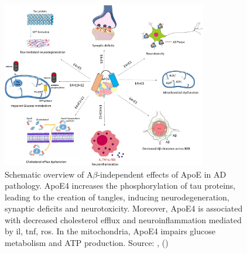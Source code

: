 \documentclass{amsart}
\begin{document}
\begin{figure}[b]
  \includegraphics[width=0.8\textwidth]{figures/ApoEeffectsA.jpg}
    \caption{Schematic overview of A$\beta$-independent effects of ApoE in AD pathology. ApoE4 increases the phosphorylation of tau proteins, leading to the creation of tangles, inducing neurodegeneration, synaptic deficits and neurotoxicity. Moreover, ApoE4 is associated with decreased cholesterol efflux and neuroinflammation mediated by \acrfull{il}, \acrfull{tnf}, \acrfull{ros}. In the mitochondria, ApoE4 impairs glucose metabolism and ATP production.  Source: ,  (\citeyear{Husain2021APOETherapeutics}) \cite{Husain2021APOETherapeutics}}
  \label{ApoeEffectsB}
\end{figure}
\end{document}
